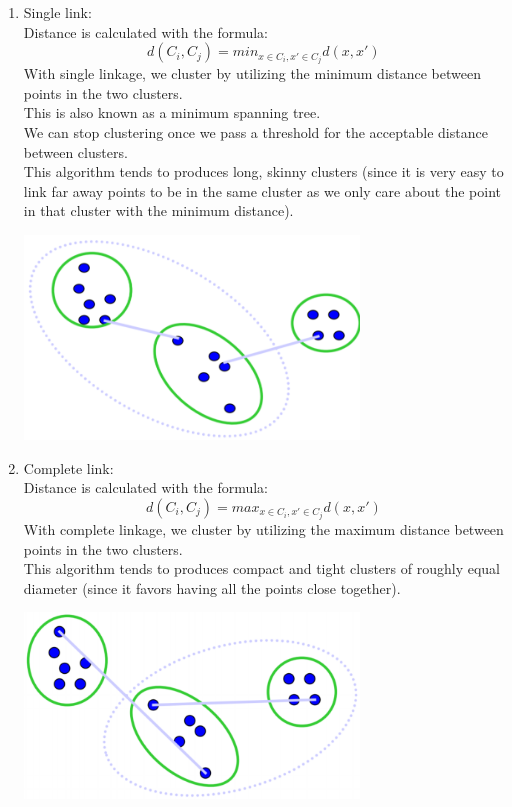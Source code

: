 \documentclass{article}
\begin{document}
\begin{enumerate}
	\item Single link:\\
	Distance is calculated with the formula:
	\begin{equation}
	    d(C_i,C_j) = min_{x \in C_i,x' \in C_j}d(x,x')
    \end{equation}
    With single linkage, we cluster by utilizing the minimum distance between points in the two clusters.\\
    This is also known as a minimum spanning tree.\\
    We can stop clustering once we pass a threshold for the acceptable distance between clusters.\\
    This algorithm tends to produces long, skinny clusters (since it is very easy to link far away points to be in the same cluster as we only care about the point in that cluster with the minimum distance).
    \begin{center}
        \includegraphics[width=0.70\textwidth]{single.png}
    \end{center}

	\item Complete link:\\
	Distance is calculated with the formula:
	\begin{equation}
	    d(C_i,C_j) = max_{x \in C_i,x' \in C_j}d(x,x')
    \end{equation}
    With complete linkage, we cluster by utilizing the maximum distance between points in the two clusters.\\
    This algorithm tends to produces compact and tight clusters of roughly equal diameter (since it favors having all the points close together).
    \begin{center}
        \includegraphics[width=0.70\textwidth]{complete.png}
    \end{center}


\end{enumerate}
\end{document}
